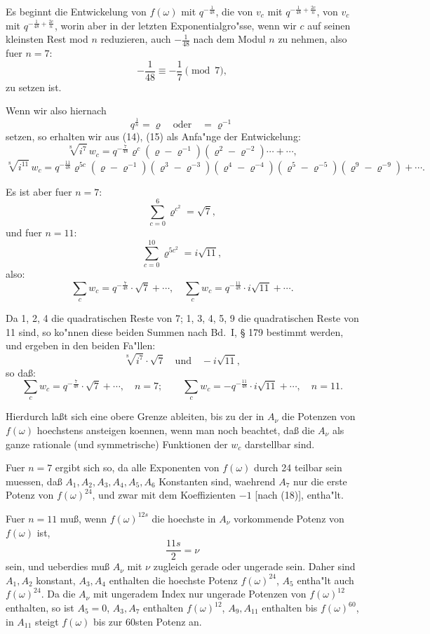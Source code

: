 \documentclass[12pt,a4paper]{article}
\theoremstyle{plain}
\theoremstyle{definition}
\theoremstyle{remark}
\begin{document}
Es beginnt die Entwickelung von $f(\omega)$ mit $q^{-\frac{1}{48}}$, die von $v_c$ mit $q^{-\frac{1}{48} + \frac{2c}{n}}$, von $v_c$ mit $q^{-\frac{1}{48} + \frac{2c}{n}}$, worin aber in der letzten Exponentialgro"sse, wenn wir $c$ auf seinen kleinsten Rest mod $n$ reduzieren, auch $-\frac{1}{48}$ nach dem Modul $n$ zu nehmen, also fuer $n = 7$:
\[
-\frac{1}{48} \equiv -\frac{1}{7} \pmod{7},
\]
zu setzen ist.

Wenn wir also hiernach
\[
q^{\frac{1}{n}} = \varrho \quad \text{oder} \quad = \varrho^{-1}
\]
setzen, so erhalten wir aus (14), (15) als Anfa"nge der Entwickelung:
\[
\sqrt[8]{i^7}\, w_c = q^{-\frac{7}{48}} \varrho^{c}(\varrho - \varrho^{-1})(\varrho^2 - \varrho^{-2}) \cdots + \cdots,
\]
\[
\sqrt[8]{i^{11}}\, w_c = q^{-\frac{11}{48}} \varrho^{5c}(\varrho - \varrho^{-1})(\varrho^3 - \varrho^{-3})(\varrho^4 - \varrho^{-4})(\varrho^5 - \varrho^{-5})(\varrho^9 - \varrho^{-9}) + \cdots.
\]

Es ist aber fuer $n = 7$:
\[
\sum_{c=0}^{6} \varrho^{c^2} = \sqrt{7},
\]
und fuer $n = 11$:
\[
\sum_{c=0}^{10} \varrho^{5c^2} = i\sqrt{11},
\]
also:
\[
\sum_{c} w_c = q^{-\frac{7}{48}} \cdot \sqrt{7} + \cdots, \quad \sum_{c} w_c = q^{-\frac{11}{48}} \cdot i\sqrt{11} + \cdots.
\]

Da 1, 2, 4 die quadratischen Reste von 7; 1, 3, 4, 5, 9 die quadratischen Reste von 11 sind, so ko"nnen diese beiden Summen nach Bd.\ I, \S{} 179 bestimmt werden, und ergeben in den beiden Fa"llen:
\[
\sqrt[8]{i^7} \cdot \sqrt{7} \quad \text{und} \quad -i\sqrt{11},
\]
so da\ss{}:
\begin{equation}\label{eq:133_18c}
\sum_{c} w_c = q^{-\frac{7}{48}} \cdot \sqrt{7} + \cdots, \quad n = 7; \qquad \sum_{c} w_c = -q^{-\frac{11}{48}} \cdot i\sqrt{11} + \cdots, \quad n = 11.
\end{equation}

\newpage

Hierdurch la\ss{}t sich eine obere Grenze ableiten, bis zu der in $A_\nu$ die Potenzen von $f(\omega)$ hoechstens ansteigen koennen, wenn man noch beachtet, da\ss{} die $A_\nu$ als ganze rationale (und symmetrische) Funktionen der $w_c$ darstellbar sind.

Fuer $n = 7$ ergibt sich so, da alle Exponenten von $f(\omega)$ durch 24 teilbar sein muessen, da\ss{} $A_1, A_2, A_3, A_4, A_5, A_6$ Konstanten sind, waehrend $A_7$ nur die erste Potenz von $f(\omega)^{24}$, und zwar mit dem Koeffizienten $-1$ [nach (18)], entha"lt.

Fuer $n = 11$ mu\ss{}, wenn $f(\omega)^{12s}$ die hoechste in $A_\nu$ vorkommende Potenz von $f(\omega)$ ist,
\[
\frac{11s}{2} = \nu
\]
sein, und ueberdies mu\ss{} $A_\nu$ mit $\nu$ zugleich gerade oder ungerade sein. Daher sind $A_1, A_2$ konstant, $A_3, A_4$ enthalten die hoechste Potenz $f(\omega)^{24}$, $A_5$ entha"lt auch $f(\omega)^{24}$.
Da die $A_\nu$ mit ungeradem Index nur ungerade Potenzen von $f(\omega)^{12}$ enthalten, so ist $A_5 = 0$, $A_3, A_7$ enthalten $f(\omega)^{12}$, $A_9, A_{11}$ enthalten bis $f(\omega)^{60}$, in $A_{11}$ steigt $f(\omega)$ bis zur 60sten Potenz an.
\end{document}
